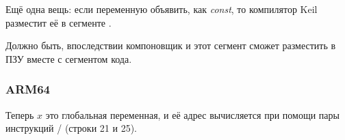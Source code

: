 \myindex{\ROM}
Ещё одна вещь: если переменную объявить, как \emph{const}, то компилятор Keil разместит её в сегменте .

Должно быть, впоследствии компоновщик и этот сегмент сможет разместить в ПЗУ вместе с сегментом кода.

\subsubsection{ARM64}



Теперь $x$ это глобальная переменная, и её адрес вычисляется при помощи пары инструкций / (строки 21 и 25).

